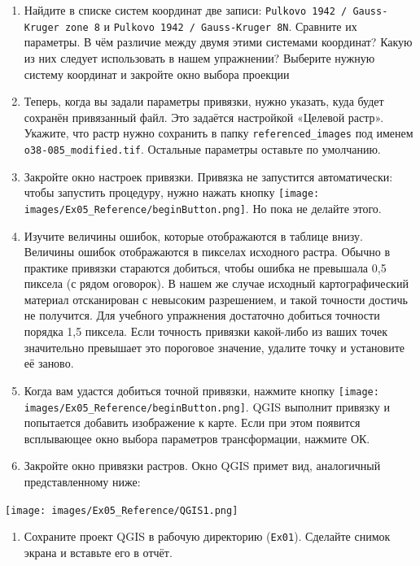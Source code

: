 \documentclass[
  12pt,
]{book}
\providecommand{\tightlist}{%
  \setlength{\itemsep}{0pt}\setlength{\parskip}{0pt}}
\begin{document}
\begin{enumerate}
\def\labelenumi{\arabic{enumi}.}
\setcounter{enumi}{14}
\item
  Найдите в списке систем координат две записи: \texttt{Pulkovo\ 1942\ /\ Gauss-Kruger\ zone\ 8} и \texttt{Pulkovo\ 1942\ /\ Gauss-Kruger\ 8N}. Сравните их параметры. В чём различие между двумя этими системами координат? Какую из них следует использовать в нашем упражнении? Выберите нужную систему координат и закройте окно выбора проекции
\item
  Теперь, когда вы задали параметры привязки, нужно указать, куда будет сохранён привязанный файл. Это задаётся настройкой «Целевой растр». Укажите, что растр нужно сохранить в папку \texttt{referenced\_images} под именем \texttt{o38-085\_modified.tif}. Остальные параметры оставьте по умолчанию.
\item
  Закройте окно настроек привязки. Привязка не запустится автоматически: чтобы запустить процедуру, нужно нажать кнопку \texttt{[image: images/Ex05\_Reference/beginButton.png]}. Но пока не делайте этого.
\item
  Изучите величины ошибок, которые отображаются в таблице внизу. Величины ошибок отображаются в пикселах исходного растра. Обычно в практике привязки стараются добиться, чтобы ошибка не превышала 0,5 пиксела (с рядом оговорок). В нашем же случае исходный картографический материал отсканирован с невысоким разрешением, и такой точности достичь не получится. Для учебного упражнения достаточно добиться точности порядка 1,5 пиксела. Если точность привязки какой-либо из ваших точек значительно превышает это пороговое значение, удалите точку и установите её заново.
\item
  Когда вам удастся добиться точной привязки, нажмите кнопку \texttt{[image: images/Ex05\_Reference/beginButton.png]}. QGIS выполнит привязку и попытается добавить изображение к карте. Если при этом появится всплывающее окно выбора параметров трансформации, нажмите ОК.
\item
  Закройте окно привязки растров. Окно QGIS примет вид, аналогичный представленному ниже:
\end{enumerate}

\texttt{[image: images/Ex05\_Reference/QGIS1.png]}

\begin{enumerate}
\def\labelenumi{\arabic{enumi}.}
\setcounter{enumi}{20}
\tightlist
\item
  Сохраните проект QGIS в рабочую директорию (\texttt{Ex01}). Сделайте снимок экрана и вставьте его в отчёт.
\end{enumerate}
\end{document}
